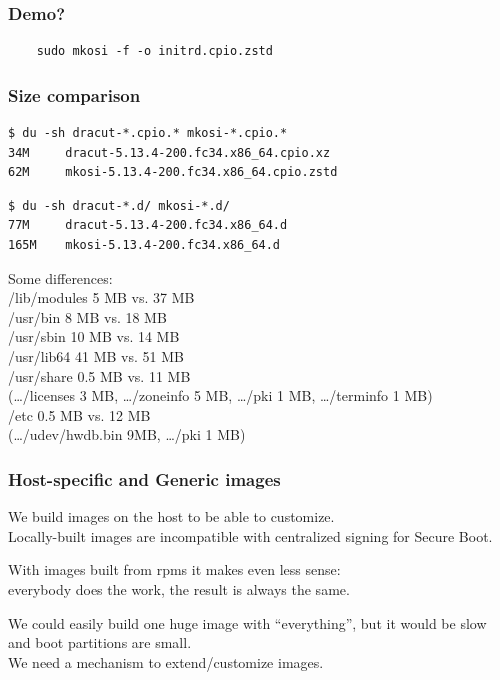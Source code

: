 \documentclass[]{beamer}
\begin{document}
\begin{frame}[fragile]
  \frametitle{Demo?}

  \begin{verbatim}
    sudo mkosi -f -o initrd.cpio.zstd
  \end{verbatim}
\end{frame}

\begin{frame}[fragile]
  \frametitle{Size comparison}

  \begin{verbatim}
$ du -sh dracut-*.cpio.* mkosi-*.cpio.*
34M     dracut-5.13.4-200.fc34.x86_64.cpio.xz
62M     mkosi-5.13.4-200.fc34.x86_64.cpio.zstd
  \end{verbatim}
  \pause
  \begin{verbatim}
$ du -sh dracut-*.d/ mkosi-*.d/
77M     dracut-5.13.4-200.fc34.x86_64.d
165M    mkosi-5.13.4-200.fc34.x86_64.d
  \end{verbatim}

  \pause
  \bigskip

  Some differences:\\
  /lib/modules  5 MB vs. 37 MB\\
  /usr/bin      8 MB vs. 18 MB\\
  /usr/sbin    10 MB vs. 14 MB\\
  /usr/lib64   41 MB vs. 51 MB\\
  /usr/share    0.5 MB vs. 11 MB\\
  (…/licenses 3 MB, …/zoneinfo 5 MB, …/pki 1 MB, …/terminfo 1 MB)\\
  /etc          0.5 MB vs. 12 MB\\
  (…/udev/hwdb.bin 9MB, …/pki 1 MB)

\end{frame}

\begin{frame}
  \frametitle{Host-specific and Generic images}

  We build images on the host to be able to customize.\\
  Locally-built images are incompatible with centralized signing for Secure Boot.

  \bigskip
  \pause

  With images built from rpms it makes even less sense:\\
  everybody does the work, the result is always the same.

  \bigskip
  \pause

  We could easily build one huge image with ``everything'', but
  it would be slow and boot partitions are small.\\

  We need a mechanism to extend/customize images.
\end{frame}
\end{document}
